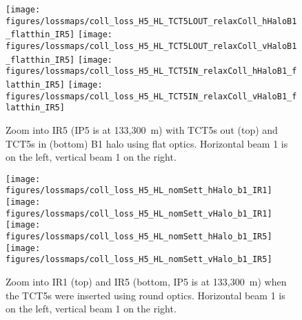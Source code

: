 \begin{figure}
\begin{center}
\vskip-12mm
\texttt{[image: figures/lossmaps/coll\_loss\_H5\_HL\_TCT5LOUT\_relaxColl\_hHaloB1\_flatthin\_IR5]}
\texttt{[image: figures/lossmaps/coll\_loss\_H5\_HL\_TCT5LOUT\_relaxColl\_vHaloB1\_flatthin\_IR5]}
\texttt{[image: figures/lossmaps/coll\_loss\_H5\_HL\_TCT5IN\_relaxColl\_hHaloB1\_flatthin\_IR5]}
\texttt{[image: figures/lossmaps/coll\_loss\_H5\_HL\_TCT5IN\_relaxColl\_vHaloB1\_flatthin\_IR5]}
\end{center}
\vspace{-0.3cm}
 \caption{Zoom into IR5 (IP5 is at 133,300~m) with TCT5s out (top) and TCT5s in (bottom) B1 halo using flat optics. Horizontal beam 1 is on the left, vertical beam 1 on the right.
  \label{IR5_flatB1}}
\end{figure}


\begin{figure} %
\begin{center}

\texttt{[image: figures/lossmaps/coll\_loss\_H5\_HL\_nomSett\_hHalo\_b1\_IR1]}
\texttt{[image: figures/lossmaps/coll\_loss\_H5\_HL\_nomSett\_vHalo\_b1\_IR1]}
\texttt{[image: figures/lossmaps/coll\_loss\_H5\_HL\_nomSett\_hHalo\_b1\_IR5]}
\texttt{[image: figures/lossmaps/coll\_loss\_H5\_HL\_nomSett\_vHalo\_b1\_IR5]}
\end{center}
\vspace{-0.3cm}
 \caption{Zoom into IR1 (top) and IR5 (bottom, IP5 is at 133,300~m) when the TCT5s were inserted using round optics. Horizontal beam 1 is on the left, vertical beam 1 on the right.
  \label{IR15_roundB1_nomSett}}
\end{figure}

